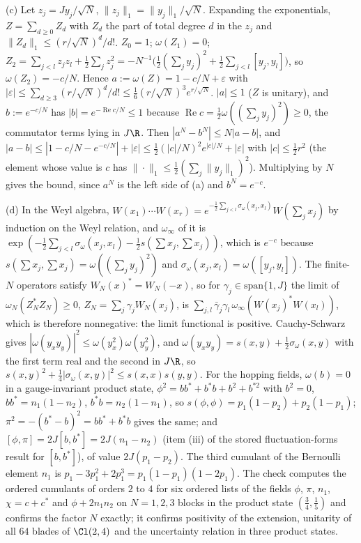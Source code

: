 (c) Let $z_{j} = Jy_{j}/\sqrt N$, $\|z_{j}\|_{1} = \|y_{j}\|_{1}/\sqrt N$. Expanding the exponentials, $Z = \sum_{d \ge 0}Z_{d}$ with $Z_{d}$ the part of total degree $d$ in the $z_{j}$ and $\|Z_{d}\|_{1} \le (r/\sqrt N)^{d}/d!$. $Z_{0} = 1$; $\omega(Z_{1}) = 0$; $Z_{2} = \sum_{j < l}z_{j}z_{l} + \tfrac12\sum_{j}z_{j}^{2} = -N^{-1}\bigl(\tfrac12(\sum_{j}y_{j})^{2} + \tfrac12\sum_{j < l}[y_{j}, y_{l}]\bigr)$, so $\omega(Z_{2}) = -c/N$. Hence $a := \omega(Z) = 1 - c/N + \varepsilon$ with $|\varepsilon| \le \sum_{d \ge 3}(r/\sqrt N)^{d}/d! \le \tfrac16(r/\sqrt N)^{3}e^{r/\sqrt N}$. $|a| \le 1$ ($Z$ is unitary), and $b := e^{-c/N}$ has $|b| = e^{-\operatorname{Re}c/N} \le 1$ because $\operatorname{Re}c = \tfrac12\omega((\sum_{j}y_{j})^{2}) \ge 0$, the commutator terms lying in $J\R$. Then $|a^{N} - b^{N}| \le N|a - b|$, and $|a - b| \le |1 - c/N - e^{-c/N}| + |\varepsilon| \le \tfrac12(|c|/N)^{2}e^{|c|/N} + |\varepsilon|$ with $|c| \le \tfrac12 r^{2}$ (the element whose value is $c$ has $\|\cdot\|_{1} \le \tfrac12(\sum_{j}\|y_{j}\|_{1})^{2}$). Multiplying by $N$ gives the bound, since $a^{N}$ is the left side of (a) and $b^{N} = e^{-c}$.

(d) In the Weyl algebra, $W(x_{1})\cdots W(x_{r}) = e^{-\frac12\sum_{j < l}\sigma_{\omega}(x_{j}, x_{l})}W(\sum_{j}x_{j})$ by induction on the Weyl relation, and $\omega_{\infty}$ of it is $\exp(-\tfrac12\sum_{j < l}\sigma_{\omega}(x_{j}, x_{l}) - \tfrac12 s(\sum x_{j}, \sum x_{j}))$, which is $e^{-c}$ because $s(\sum x_{j}, \sum x_{j}) = \omega((\sum_{j}y_{j})^{2})$ and $\sigma_{\omega}(x_{j}, x_{l}) = \omega([y_{j}, y_{l}])$. The finite-$N$ operators satisfy $W_{N}(x)^{*} = W_{N}(-x)$, so for $\gamma_{j} \in \mathrm{span}\{1, J\}$ the limit of $\omega_{N}(Z_{N}^{*}Z_{N}) \ge 0$, $Z_{N} = \sum_{j}\gamma_{j}W_{N}(x_{j})$, is $\sum_{j, l}\bar\gamma_{j}\gamma_{l}\,\omega_{\infty}(W(x_{j})^{*}W(x_{l}))$, which is therefore nonnegative: the limit functional is positive. Cauchy-Schwarz gives $|\omega(y_{x}y_{y})|^{2} \le \omega(y_{x}^{2})\omega(y_{y}^{2})$, and $\omega(y_{x}y_{y}) = s(x, y) + \tfrac12\sigma_{\omega}(x, y)$ with the first term real and the second in $J\R$, so $s(x, y)^{2} + \tfrac14|\sigma_{\omega}(x, y)|^{2} \le s(x, x)s(y, y)$. For the hopping fields, $\omega(b) = 0$ in a gauge-invariant product state, $\phi^{2} = bb^{*} + b^{*}b + b^{2} + b^{*2}$ with $b^{2} = 0$, $bb^{*} = n_{1}(1 - n_{2})$, $b^{*}b = n_{2}(1 - n_{1})$, so $s(\phi, \phi) = p_{1}(1 - p_{2}) + p_{2}(1 - p_{1})$; $\pi^{2} = -(b^{*} - b)^{2} = bb^{*} + b^{*}b$ gives the same; and $[\phi, \pi] = 2J[b, b^{*}] = 2J(n_{1} - n_{2})$ (item (iii) of the stored fluctuation-forms result for $[b, b^{*}]$), of value $2J(p_{1} - p_{2})$. The third cumulant of the Bernoulli element $n_{1}$ is $p_{1} - 3p_{1}^{2} + 2p_{1}^{3} = p_{1}(1 - p_{1})(1 - 2p_{1})$. The check computes the ordered cumulants of orders $2$ to $4$ for six ordered lists of the fields $\phi$, $\pi$, $n_{1}$, $\chi = c + c^{*}$ and $\phi + 2n_{1}n_{2}$ on $N = 1, 2, 3$ blocks in the product state $(\tfrac34, \tfrac15)$ and confirms the factor $N$ exactly; it confirms positivity of the extension, unitarity of all $64$ blades of $\Cl(2,4)$ and the uncertainty relation in three product states.

